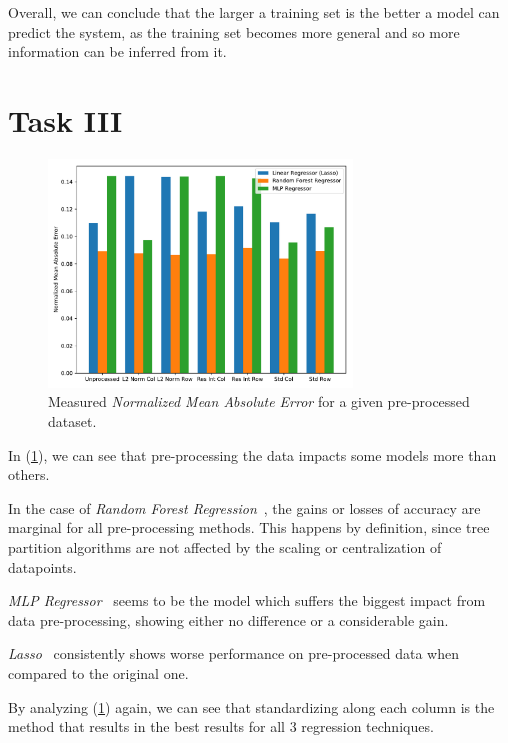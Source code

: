 \documentclass[]{article}
\begin{document}
Overall, we can conclude that the larger a training set is the better a model can predict the system, as the training set becomes more general and so more information can be inferred from it.

\pagebreak

\section{\textbf{Task III}}
\label{sec:2}

\begin{figure}[h!]
    \centering
    \captionsetup{justification=centering}
    \includegraphics[width=0.72\textwidth,height=\textheight,keepaspectratio]{../result/project1/pre_processing_accuracies.pdf}
    \caption{Measured \textit{Normalized Mean Absolute Error} for a given pre-processed dataset.}
    \label{fig:2}
\end{figure}

In (\ref{fig:2}), we can see that pre-processing the data impacts some models more than others.

In the case of \textit{Random Forest Regression}~\cite{RFR}, the gains or losses of accuracy are marginal for all pre-processing methods. This happens by definition, since tree partition algorithms are not affected by the scaling or centralization of datapoints.

\textit{MLP Regressor}~\cite{MLPR} seems to be the model which suffers the biggest impact from data pre-processing, showing either no difference or a considerable gain.

\textit{Lasso}~\cite{Lasso} consistently shows worse performance on pre-processed data when compared to the original one.

By analyzing (\ref{fig:2}) again, we can see that standardizing along each column is the method that results in the best results for all 3 regression techniques.
\end{document}
